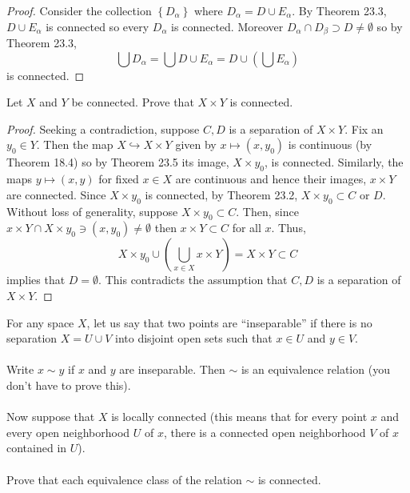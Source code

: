 \begin{proof}
Consider the collection $\left\{D_\alpha\right\}$ where
$D_\alpha=D\cup E_\alpha$. By Theorem 23.3, $D\cup E_\alpha$ is
connected so every $D_\alpha$ is connected. Moreover
$D_\alpha\cap D_\beta\supset D\neq\emptyset$ so by Theorem 23.3,
\[
\bigcup D_\alpha=\bigcup D\cup E_\alpha=D\cup\left(\bigcup E_\alpha\right)
\]
is connected.
\end{proof}
\begin{problem}
Let $X$ and $Y$ be connected. Prove that $X\times Y$ is connected.
\end{problem}
\begin{proof}
Seeking a contradiction, suppose $C,D$ is a separation of
$X\times Y$. Fix an $y_0\in Y$. Then the map
$X\hookrightarrow X\times Y$ given by $x\mapsto (x,y_0)$ is
continuous (by Theorem 18.4) so by Theorem 23.5 its image,
$X\times y_0$, is connected. Similarly, the maps $y\mapsto
(x,y)$ for fixed $x\in X$ are continuous and hence their images,
$x\times Y$ are connected. Since $X\times y_0$ is connected, by
Theorem 23.2, $X\times y_0\subset C$ or $D$. Without loss of
generality, suppose $X\times y_0\subset C$. Then, since $x\times
Y\cap X\times y_0\ni (x,y_0)\neq\emptyset$ then $x\times Y\subset
C$ for all $x$. Thus,
\[
X\times y_0\cup\left(\bigcup_{x\in X}x\times Y\right)=X\times
Y\subset C
\]
implies that $D=\emptyset$. This contradicts the assumption
that $C,D$ is a separation of $X\times Y$.
\end{proof}
\begin{problem}
For any space $X$, let us say that two points are ``inseparable''
if there is no separation $X=U\cup V$ into disjoint open sets
such that $x\in U$ and $y\in V$.
\\\\
Write $x\sim y$ if $x$ and $y$
are inseparable. Then $\sim$ is an equivalence relation (you
don't have to prove this).
\\\\
Now suppose that $X$ is locally connected (this means that for
every point $x$ and every open neighborhood $U$ of $x$, there is
a connected open neighborhood $V$ of $x$ contained in $U$).
\\\\
Prove that each equivalence class of the relation $\sim$ is connected.
\end{problem}
